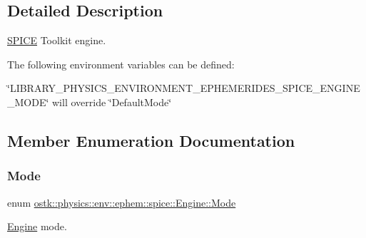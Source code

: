\subsection{Detailed Description}
\hyperlink{classostk_1_1physics_1_1env_1_1ephem_1_1_s_p_i_c_e}{S\+P\+I\+CE} Toolkit engine. 

The following environment variables can be defined\+:


\begin{DoxyItemize}
\item \char`\"{}\+L\+I\+B\+R\+A\+R\+Y\+\_\+\+P\+H\+Y\+S\+I\+C\+S\+\_\+\+E\+N\+V\+I\+R\+O\+N\+M\+E\+N\+T\+\_\+\+E\+P\+H\+E\+M\+E\+R\+I\+D\+E\+S\+\_\+\+S\+P\+I\+C\+E\+\_\+\+E\+N\+G\+I\+N\+E\+\_\+\+M\+O\+D\+E\char`\"{} will override \char`\"{}\+Default\+Mode\char`\"{} 
\end{DoxyItemize}

\subsection{Member Enumeration Documentation}
\mbox{\label{classostk_1_1physics_1_1env_1_1ephem_1_1spice_1_1_engine_a803b82d8f41c81e861852098b6b75ae2}} 
\subsubsection{\texorpdfstring{Mode}{Mode}}
{\footnotesize\ttfamily enum \hyperlink{classostk_1_1physics_1_1env_1_1ephem_1_1spice_1_1_engine_a803b82d8f41c81e861852098b6b75ae2}{ostk\+::physics\+::env\+::ephem\+::spice\+::\+Engine\+::\+Mode}\hspace{0.3cm}{\ttfamily [strong]}}



\hyperlink{classostk_1_1physics_1_1env_1_1ephem_1_1spice_1_1_engine}{Engine} mode. 

